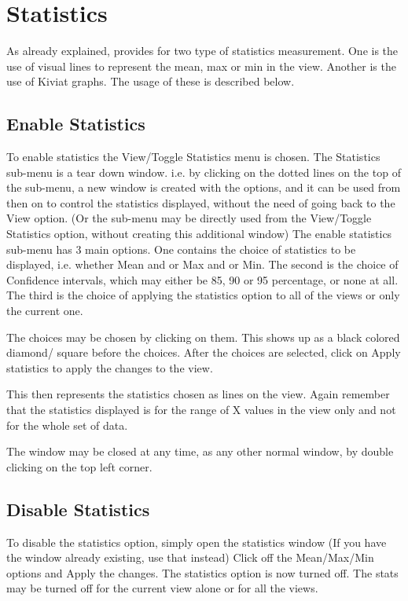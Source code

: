 \section{Statistics}

As already explained, \Devise provides for two type of statistics
measurement. One is the use of visual lines to represent the mean, max
or min in the view. Another is the use of Kiviat graphs. The usage of
these is described below.

\subsection{Enable Statistics}

To enable statistics the View/Toggle Statistics menu is chosen. The
Statistics sub-menu is a tear down window. i.e. by clicking on the
dotted lines on the top of the sub-menu, a new window is created with
the options, and it can be used from then on to control the statistics
displayed, without the need of going back to the View option. (Or the
sub-menu may be directly used from the View/Toggle Statistics option,
without creating this additional window) The enable statistics sub-menu
has 3 main options. One contains the choice of statistics to be
displayed, i.e. whether Mean and or Max and or Min. The second is the
choice of Confidence intervals, which may either be 85, 90 or 95
percentage, or none at all. The third is the choice of applying the
statistics option to all of the views or only the current one.

The choices may be chosen by clicking on them. This shows up as a
black colored diamond/ square before the choices. After the choices
are selected, click on Apply statistics to apply the changes to the
view.

This then represents the statistics chosen as lines on the view. Again
remember that the statistics displayed is for the range of X values in
the view only and not for the whole set of data.

The window may be closed at any time, as any other normal window, by
double clicking on the top left corner.

\subsection{Disable Statistics}

To disable the statistics option, simply open the statistics window
(If you have the window already existing, use that instead) Click off
the Mean/Max/Min options and Apply the changes. The statistics option
is now turned off. The stats may be turned off for the current view
alone or for all the views.


